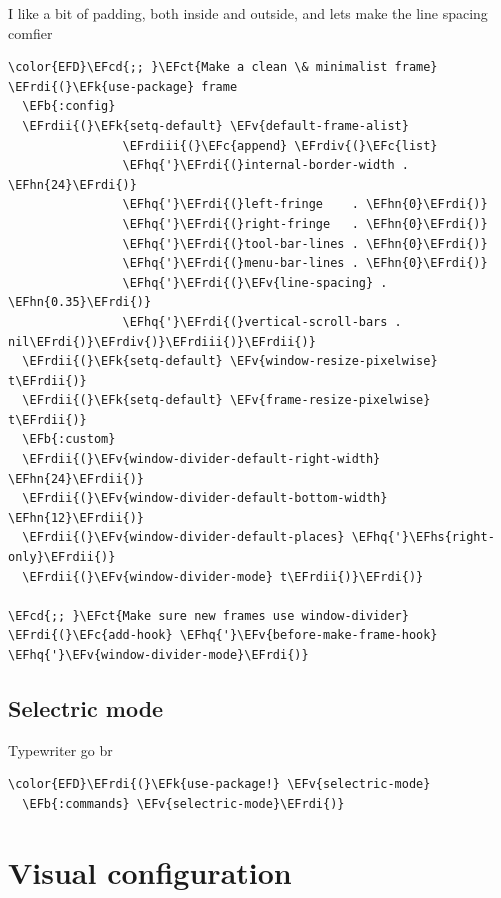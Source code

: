 \documentclass{scrartcl}
\newcommand{\EFk}[1]{\textcolor{EFk}{#1}} %
\newcommand{\EFb}[1]{\textcolor{EFb}{#1}} %
\newcommand{\EFct}[1]{\textcolor{EFct}{#1}} %
\newcommand{\EFc}[1]{\textcolor{EFc}{#1}} %
\newcommand{\EFv}[1]{\textcolor{EFv}{#1}} %
\newcommand{\EFcd}[1]{\textcolor{EFcd}{#1}} %
\newcommand{\EFhn}[1]{#1} %
\newcommand{\EFhq}[1]{#1} %
\newcommand{\EFhs}[1]{#1} %
\newcommand{\EFrdi}[1]{#1} %
\newcommand{\EFrdii}[1]{#1} %
\newcommand{\EFrdiii}[1]{#1} %
\newcommand{\EFrdiv}[1]{#1} %
\begin{document}
I like a bit of padding, both inside and outside, and lets make the line spacing comfier
\begin{Code}
\begin{Verbatim}[]
\color{EFD}\EFcd{;; }\EFct{Make a clean \& minimalist frame}
\EFrdi{(}\EFk{use-package} frame
  \EFb{:config}
  \EFrdii{(}\EFk{setq-default} \EFv{default-frame-alist}
                \EFrdiii{(}\EFc{append} \EFrdiv{(}\EFc{list}
                \EFhq{'}\EFrdi{(}internal-border-width . \EFhn{24}\EFrdi{)}
                \EFhq{'}\EFrdi{(}left-fringe    . \EFhn{0}\EFrdi{)}
                \EFhq{'}\EFrdi{(}right-fringe   . \EFhn{0}\EFrdi{)}
                \EFhq{'}\EFrdi{(}tool-bar-lines . \EFhn{0}\EFrdi{)}
                \EFhq{'}\EFrdi{(}menu-bar-lines . \EFhn{0}\EFrdi{)}
                \EFhq{'}\EFrdi{(}\EFv{line-spacing} . \EFhn{0.35}\EFrdi{)}
                \EFhq{'}\EFrdi{(}vertical-scroll-bars . nil\EFrdi{)}\EFrdiv{)}\EFrdiii{)}\EFrdii{)}
  \EFrdii{(}\EFk{setq-default} \EFv{window-resize-pixelwise} t\EFrdii{)}
  \EFrdii{(}\EFk{setq-default} \EFv{frame-resize-pixelwise} t\EFrdii{)}
  \EFb{:custom}
  \EFrdii{(}\EFv{window-divider-default-right-width} \EFhn{24}\EFrdii{)}
  \EFrdii{(}\EFv{window-divider-default-bottom-width} \EFhn{12}\EFrdii{)}
  \EFrdii{(}\EFv{window-divider-default-places} \EFhq{'}\EFhs{right-only}\EFrdii{)}
  \EFrdii{(}\EFv{window-divider-mode} t\EFrdii{)}\EFrdi{)}

\EFcd{;; }\EFct{Make sure new frames use window-divider}
\EFrdi{(}\EFc{add-hook} \EFhq{'}\EFv{before-make-frame-hook} \EFhq{'}\EFv{window-divider-mode}\EFrdi{)}
\end{Verbatim}
\end{Code}

\subsection{Selectric mode}
\label{sec:orgd504ba2}
Typewriter go br
\begin{Code}
\begin{Verbatim}[]
\color{EFD}\EFrdi{(}\EFk{use-package!} \EFv{selectric-mode}
  \EFb{:commands} \EFv{selectric-mode}\EFrdi{)}
\end{Verbatim}
\end{Code}

\section{Visual configuration}
\label{sec:orgd8ef9ff}
\end{document}
